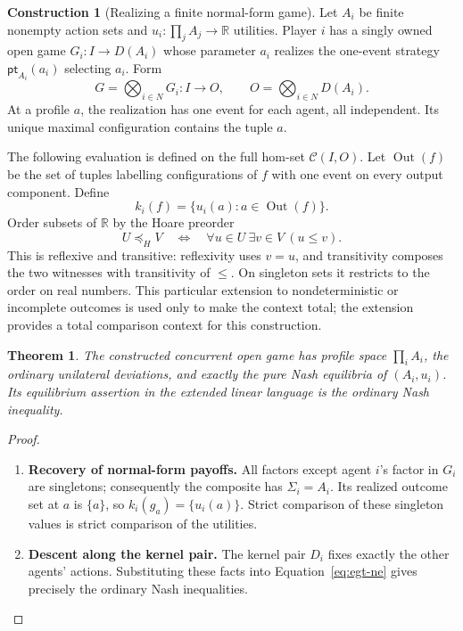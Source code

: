 \documentclass[11pt,a4paper]{article}
\numberwithin{equation}{section}
\newtheorem{theorem}{Theorem}[section]
\theoremstyle{definition}
\newtheorem{construction}[construction]{Construction}
\theoremstyle{remark}
\theoremstyle{plain}
\begin{document}
\begin{construction}[Realizing a finite normal-form game]
Let $A_i$ be finite nonempty action sets and
$u_i:\prod_j A_j\to\mathbb R$ utilities. Player $i$ has a singly owned open game
$G_i:I\to D(A_i)$ whose parameter $a_i$ realizes the one-event strategy
$\mathsf{pt}_{A_i}(a_i)$ selecting $a_i$. Form
\[
 G=\bigotimes_{i\in N}G_i:I\longrightarrow O,
 \qquad O=\bigotimes_{i\in N}D(A_i).
\]
At a profile $a$, the realization has one event for each agent, all
independent. Its unique maximal configuration contains the tuple $a$.

The following evaluation is defined on the full hom-set $\mathcal C(I,O)$. Let $\operatorname{Out}(f)$ be
the set of tuples labelling configurations of $f$ with one event on every
output component. Define
\[
 k_i(f)=\{u_i(a):a\in\operatorname{Out}(f)\}.
\]
Order subsets of $\mathbb R$ by the Hoare preorder
\[
 U\preceq_H V\quad\Longleftrightarrow\quad
 \forall u\in U\ \exists v\in V\ (u\leq v).
\]
This is reflexive and transitive: reflexivity uses $v=u$, and
transitivity composes the two witnesses with transitivity of $\leq$.
On singleton sets it restricts to the order on real numbers. This particular extension to
nondeterministic or incomplete outcomes is used only to make the context
total; the extension provides a total comparison context for this construction.
\end{construction}

\begin{theorem}
\label{thm:egt-normal}
The constructed concurrent open game has profile space $\prod_i A_i$, the ordinary
unilateral deviations, and exactly the pure Nash equilibria of $(A_i,u_i)$.
Its equilibrium assertion in the extended linear language is the ordinary
Nash inequality.
\end{theorem}
\begin{proof}
\leavevmode
\begin{enumerate}[label=\textup{(\arabic*)},leftmargin=*,itemsep=4pt,topsep=3pt]
  \item \textbf{Recovery of normal-form payoffs.} All factors except agent $i$'s factor in $G_i$ are singletons; consequently
the composite has $\Sigma_i=A_i$. Its realized outcome set at $a$ is
$\{a\}$, so $k_i(g_a)=\{u_i(a)\}$. Strict comparison of these singleton
values is strict comparison of the utilities.
  \item \textbf{Descent along the kernel pair.} The kernel pair $D_i$ fixes
exactly the other agents' actions. Substituting these facts into
Equation~\eqref{eq:egt-ne} gives
precisely the ordinary Nash inequalities.
\end{enumerate}
\end{proof}
\end{document}
